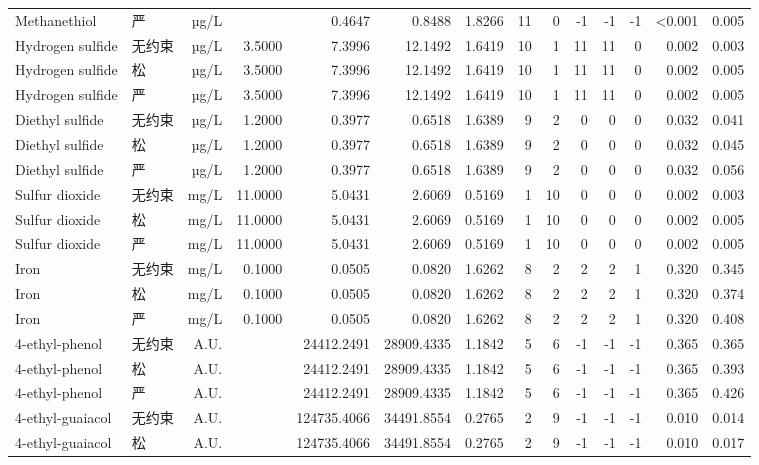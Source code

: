 {\begin{longtable}{llrrrrrrrrrrrr}
Methanethiol & 严 & µg/L &  & 0.4647 & 0.8488 & 1.8266 & 11 & 0 & -1 & -1 & -1 & <0.001 & 0.005 \\
Hydrogen sulfide & 无约束 & µg/L & 3.5000 & 7.3996 & 12.1492 & 1.6419 & 10 & 1 & 11 & 11 & 0 & 0.002 & 0.003 \\
Hydrogen sulfide & 松 & µg/L & 3.5000 & 7.3996 & 12.1492 & 1.6419 & 10 & 1 & 11 & 11 & 0 & 0.002 & 0.005 \\
Hydrogen sulfide & 严 & µg/L & 3.5000 & 7.3996 & 12.1492 & 1.6419 & 10 & 1 & 11 & 11 & 0 & 0.002 & 0.005 \\
Diethyl sulfide & 无约束 & µg/L & 1.2000 & 0.3977 & 0.6518 & 1.6389 & 9 & 2 & 0 & 0 & 0 & 0.032 & 0.041 \\
Diethyl sulfide & 松 & µg/L & 1.2000 & 0.3977 & 0.6518 & 1.6389 & 9 & 2 & 0 & 0 & 0 & 0.032 & 0.045 \\
Diethyl sulfide & 严 & µg/L & 1.2000 & 0.3977 & 0.6518 & 1.6389 & 9 & 2 & 0 & 0 & 0 & 0.032 & 0.056 \\
Sulfur dioxide & 无约束 & mg/L & 11.0000 & 5.0431 & 2.6069 & 0.5169 & 1 & 10 & 0 & 0 & 0 & 0.002 & 0.003 \\
Sulfur dioxide & 松 & mg/L & 11.0000 & 5.0431 & 2.6069 & 0.5169 & 1 & 10 & 0 & 0 & 0 & 0.002 & 0.005 \\
Sulfur dioxide & 严 & mg/L & 11.0000 & 5.0431 & 2.6069 & 0.5169 & 1 & 10 & 0 & 0 & 0 & 0.002 & 0.005 \\
Iron & 无约束 & mg/L & 0.1000 & 0.0505 & 0.0820 & 1.6262 & 8 & 2 & 2 & 2 & 1 & 0.320 & 0.345 \\
Iron & 松 & mg/L & 0.1000 & 0.0505 & 0.0820 & 1.6262 & 8 & 2 & 2 & 2 & 1 & 0.320 & 0.374 \\
Iron & 严 & mg/L & 0.1000 & 0.0505 & 0.0820 & 1.6262 & 8 & 2 & 2 & 2 & 1 & 0.320 & 0.408 \\
4-ethyl-phenol & 无约束 & A.U. &  & 24412.2491 & 28909.4335 & 1.1842 & 5 & 6 & -1 & -1 & -1 & 0.365 & 0.365 \\
4-ethyl-phenol & 松 & A.U. &  & 24412.2491 & 28909.4335 & 1.1842 & 5 & 6 & -1 & -1 & -1 & 0.365 & 0.393 \\
4-ethyl-phenol & 严 & A.U. &  & 24412.2491 & 28909.4335 & 1.1842 & 5 & 6 & -1 & -1 & -1 & 0.365 & 0.426 \\
4-ethyl-guaiacol & 无约束 & A.U. &  & 124735.4066 & 34491.8554 & 0.2765 & 2 & 9 & -1 & -1 & -1 & 0.010 & 0.014 \\
4-ethyl-guaiacol & 松 & A.U. &  & 124735.4066 & 34491.8554 & 0.2765 & 2 & 9 & -1 & -1 & -1 & 0.010 & 0.017 \\

\end{longtable}}
